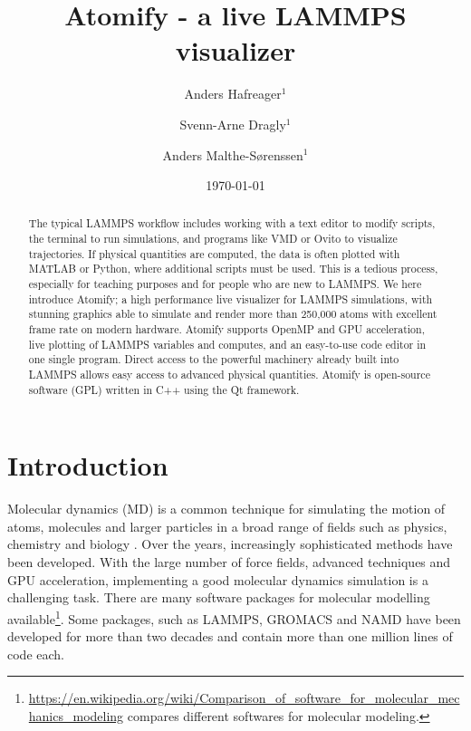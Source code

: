 \documentclass[aps,pre,twocolumn,letterpaper,floatfix,nofootinbib]{revtex4}
\begin{document}
\title{Atomify - a live LAMMPS visualizer}
\author{Anders Hafreager$^1$}
\author{Svenn-Arne Dragly$^{1}$} 
\author{Anders Malthe-S\o renssen$^1$}
\date{\today} 


\begin{abstract}
%
The typical LAMMPS workflow includes working with a text editor to modify
scripts, the terminal to run simulations, and programs like VMD or Ovito to
visualize trajectories.
If physical quantities are computed, the data is often plotted with MATLAB or
Python, where additional scripts must be used.
This is a tedious process, especially for teaching purposes and for people who
are new to LAMMPS.
We here introduce Atomify;
a high performance live visualizer for LAMMPS simulations,
with stunning graphics able to simulate and render more than 250,000 atoms with
excellent frame rate on modern hardware.
Atomify supports OpenMP and GPU acceleration, live plotting of LAMMPS variables
and computes, and an easy-to-use code editor in one single program.
Direct access to the powerful machinery already built into LAMMPS allows easy
access to advanced physical quantities.
Atomify is open-source software (GPL) written in C++ using the Qt framework.
%
\end{abstract} 
 
\maketitle

\section{Introduction}
%
Molecular dynamics (MD) is a common technique for simulating the motion of atoms, molecules and larger particles in a broad range of fields such as physics, chemistry and biology \cite{flerefelt}.
Over the years, increasingly sophisticated methods have been developed.
With the large number of force fields, advanced techniques and GPU acceleration,
implementing a good molecular dynamics simulation is a challenging task.
There are many software packages for molecular modelling
available\footnote{\url{https://en.wikipedia.org/wiki/Comparison_of_software_for_molecular_mechanics_modeling} compares different softwares for molecular modeling.}.
Some packages, such as LAMMPS\cite{Plimpton1995Fast}, GROMACS\cite{Pronk2013}
and NAMD\cite{Phillips2005Scalable} have been developed for more than two decades 
and contain more than one million lines of code each.
\end{document}
